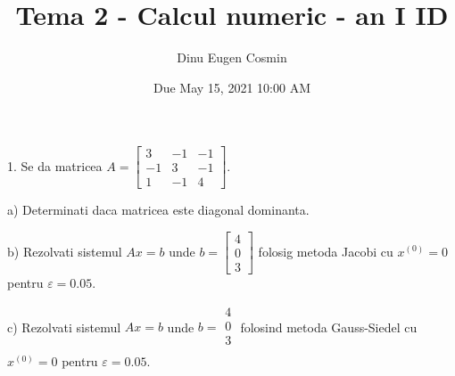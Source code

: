 \documentclass[12pt]{article}
\title{Tema 2 - Calcul numeric - an I ID}
\date{Due May 15, 2021 10:00 AM}
\author{Dinu Eugen Cosmin}
\begin{document}
\maketitle
\thispagestyle{empty}

\begin{sloppypar}
1. Se da matricea 
$A=
\begin{bmatrix}
    3 & -1 & -1 \\ 
    -1 & 3 & -1  \\ 
    1 & -1 & 4 
\end{bmatrix}$.

a) Determinati daca matricea este diagonal dominanta.

b) Rezolvati sistemul $Ax=b$ unde $b =
\begin{bmatrix}
   4 \\
   0 \\
   3 
\end{bmatrix}$ folosig metoda Jacobi cu $x^{(0)}=0$ pentru $\varepsilon=0.05$.

c) Rezolvati sistemul $Ax=b$ unde $b=
\begin{matrix}
    4 \\
    0 \\
    3 \\
\end{matrix}$ folosind metoda Gauss-Siedel cu $x^{(0)}=0$ pentru $\varepsilon=0.05$.

\end{sloppypar}
\pagebreak
\end{document}
